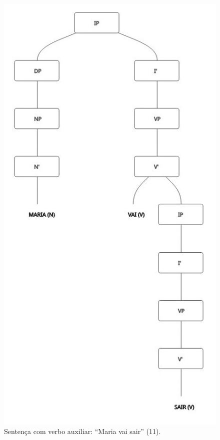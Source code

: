 \documentclass[portuguese]{textolivre}
\begin{document}
\begin{figure}[p]
 \centering
 \includegraphics[width=\textwidth,height=0.85\textheight,keepaspectratio]{Fig5.png}
 \caption{Sentença com verbo auxiliar: “Maria vai sair” (11).}
 \label{fig5}
\end{figure}
\end{document}
